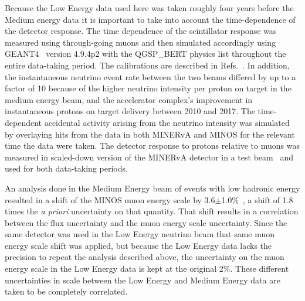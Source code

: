 \documentclass[aps,prl,twocolumn,showpacs,superscriptaddress, floatfix,10pt]{revtex4-2}
\begin{document}
Because the Low Energy data used here was taken roughly four years before the Medium energy data it is important to take into account the time-dependence of the detector response.  The time dependence of the scintillator response was measured using through-going muons and then simulated accordingly using GEANT4~\cite{Agostinelli:2002hh} version 4.9.4p2 with the QGSP\_BERT physics list throughout the entire data-taking period. 
 The calibrations are described in Refs.~\cite{Aliaga:2013uqz,MINERvA:2021mpk}.  
In addition, the instantaneous neutrino event rate between the two beams differed by up to a factor of 10 because of the higher neutrino intensity per proton on target in the medium energy beam, and the accelerator complex's improvement in instantaneous protons on target delivery between 2010 and 2017.  
The time-dependent accidental activity arising from the neutrino intensity was simulated by overlaying hits from the data in both MINERvA and MINOS for the relevant time the data were taken.  The detector response to protons relative to muons was measured in scaled-down version of the MINERvA detector in a test beam~\cite{Aliaga:2015aqe} and used for both data-taking periods.  

An analysis done in the Medium Energy beam of events with low hadronic energy resulted in a shift of the MINOS muon energy scale by 3.6$\pm$1.0\%~\cite{MINERvA:2021mpk}, a shift of 1.8 times the {\it a priori} uncertainty on that quantity.  That shift results in a correlation between the flux uncertainty and the muon energy scale uncertainty.  Since the same detector was used in the Low Energy neutrino beam that same muon energy scale shift was applied, but because the Low Energy data lacks the precision to repeat the analysis described above, the uncertainty on the muon energy scale in the Low Energy data is kept at the original 2\%.  These different uncertainties in scale between the Low Energy and Medium Energy data are taken to be completely correlated.  
\end{document}
